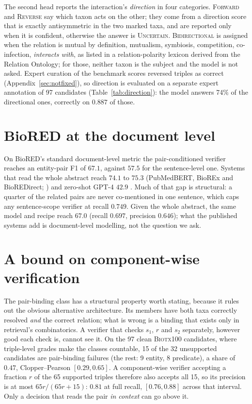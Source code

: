 \documentclass[11pt]{article}
\begin{document}
The second head reports the interaction's \emph{direction} in four categories. \textsc{Forward} and
\textsc{Reverse} say which taxon acts on the other; they come from a direction score that is exactly
antisymmetric in the two marked taxa, and are reported only when it is confident, otherwise the
answer is \textsc{Uncertain}. \textsc{Bidirectional} is assigned when the relation is mutual by
definition, mutualism, symbiosis, competition, co-infection, \emph{interacts with}, as listed
in a relation-polarity lexicon derived from the Relation Ontology; for those, neither taxon is the
subject and the model is not asked. Expert curation of the benchmark scores reversed triples as
correct (Appendix~\ref{sec:notfixed}), so direction is evaluated on a separate expert annotation of 97
candidates (Table~\ref{tab:direction}): the model answers 74\% of the directional ones, correctly on
$0.887$ of those.


\section{BioRED at the document level}
\label{app:bioredep}

On BioRED's standard document-level metric the pair-conditioned verifier reaches an entity-pair F1
of $67.1$, against $57.5$ for the sentence-level one. Systems that read the whole abstract reach
$74.1$ to $75.3$ (PubMedBERT, BioREx and BioREDirect; \citealp{lai2023biorex,lai2025bioredirect})
and zero-shot GPT-4 $42.9$ \citep{islamaj2024overview}. Much of that gap is structural: a quarter of
the related pairs are never co-mentioned in one sentence, which caps any sentence-scope verifier at
recall $0.749$. Given the whole abstract, the same model and recipe reach $67.0$ (recall $0.697$, precision
$0.646$); what the published systems add is document-level modelling, not the question we ask.

\section{A bound on component-wise verification}
\label{app:bound}

The pair-binding class has a structural property worth stating, because it rules out the obvious
alternative architecture. Its members have both taxa correctly resolved \emph{and} the correct
relation; what is wrong is a binding that exists only in retrieval's combinatorics. A verifier that
checks $s_1$, $r$ and $s_2$ separately, however good each check is, cannot see it. On the 97
clean \textsc{Biotx100} candidates, where triple-level grades make the classes countable, 15 of the
32 unsupported candidates are pair-binding failures (the rest: 9 entity, 8 predicate), a share of
$0.47$, Clopper--Pearson $[0.29, 0.65]$. A component-wise verifier accepting a fraction $r$ of the 65
supported triples therefore also accepts all 15, so its precision is at most $65r/(65r+15)$:
$0.81$ at full recall, $[0.76, 0.88]$ across that interval. Only a decision that reads the pair
\emph{in context} can go above it.
\end{document}
